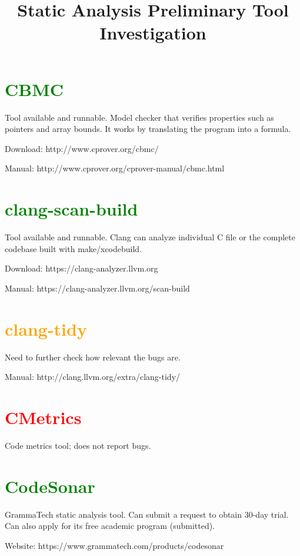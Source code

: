 \documentclass[10pt,letterpaper]{article}
\title{Static Analysis Preliminary Tool Investigation}
\begin{document}
\maketitle

\section{\textcolor{green}{CBMC}}

Tool available and runnable. Model checker that verifies properties
such as pointers and array bounds. It works by translating the program
into a formula. 

Download: http://www.cprover.org/cbmc/

Manual: http://www.cprover.org/cprover-manual/cbmc.html

\section{\textcolor{green}{clang-scan-build}}

Tool available and runnable. Clang can analyze individual C file or
the complete codebase built with make/xcodebuild.

Download: https://clang-analyzer.llvm.org

Manual: https://clang-analyzer.llvm.org/scan-build

\section{\textcolor{orange}{clang-tidy}}

Need to further check how relevant the bugs are.

Manual: http://clang.llvm.org/extra/clang-tidy/

\section{\textcolor{red}{CMetrics}}

Code metrics tool; does not report bugs.

\section{\textcolor{green}{CodeSonar}}

GrammaTech static analysis tool. Can submit a request to obtain 30-day trial.
Can also apply for its free academic program (submitted).

Website: https://www.grammatech.com/products/codesonar
\end{document}
